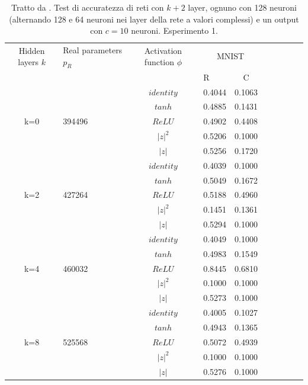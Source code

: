 \documentclass[a4paper,12pt]{report}
\begin{document}
 \newpage
 
 \begin{table}[h]
  \centering
  \begin{tabular}{cp{} cp{}   cp{} cp{} cp{}}
   \cline{1-5}
   Hidden layers $k$ & Real parameters $p_R$ & Activation function $\phi$ & \multicolumn{2}{c}{MNIST}\\
   \cline{4-5}
   & & & R & C \\
   \cline{1-5}
   & & $identity$ & 0.4044 & 0.1063 \\
   \cline{3-5}
   & & $tanh$ & 0.4885 & 0.1431 \\
   \cline{3-5}
   k=0 & 394496 & $ReLU$ & 0.4902 & 0.4408 \\
   \cline{3-5}
   & & $|z|^2$ & 0.5206 & 0.1000 \\
   \cline{3-5}
   & & $|z|$ & 0.5256 & 0.1720 \\
   \cline{1-5}
  
   & & $identity$ & 0.4039 & 0.1000 \\
   \cline{3-5}
   & & $tanh$ & 0.5049 & 0.1672 \\
   \cline{3-5}
   k=2 & 427264 & $ReLU$ & 0.5188 & 0.4960 \\
   \cline{3-5}
   & & $|z|^2$ & 0.1451 & 0.1361 \\
   \cline{3-5}
   & & $|z|$ & 0.5294 & 0.1000 \\
   \cline{1-5}
  
   & & $identity$ & 0.4049 & 0.1000 \\
   \cline{3-5}
   & & $tanh$ & 0.4983 & 0.1549 \\
   \cline{3-5}
   k=4 & 460032 & $ReLU$ & 0.8445 & 0.6810 \\
   \cline{3-5}
   & & $|z|^2$ & 0.1000 & 0.1000 \\
   \cline{3-5}
   & & $|z|$ & 0.5273 & 0.1000 \\
   \cline{1-5}
   
   & & $identity$ & 0.4005 & 0.1027 \\
   \cline{3-5}
   & & $tanh$ & 0.4943 & 0.1365 \\
   \cline{3-5}
   k=8 & 525568 & $ReLU$ & 0.5072 & 0.4939 \\
   \cline{3-5}
   & & $|z|^2$ & 0.1000 & 0.1000 \\
   \cline{3-5}
   & & $|z|$ & 0.5276 & 0.1000 \\
   \cline{1-5}
  \end{tabular}
  \caption{Tratto da \cite{monning2018evaluation}. Test di accuratezza di reti con $k+2$ layer, ognuno con 128 neuroni (alternando 128 e 64 neuroni nei layer della rete a valori complessi) e un output con $c=10$ neuroni. Esperimento 1.}
  \label{CIFAR-101Tab}
 \end{table}
 
\end{document}
